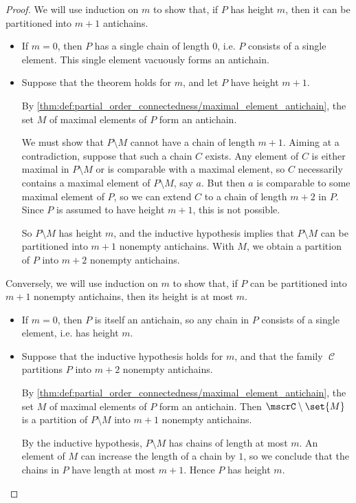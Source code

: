 \begin{proof}
  \SufficiencySubProof We will use induction on \( m \) to show that, if \( P \) has height \( m \), then it can be partitioned into \( m + 1 \) antichains.

  \begin{itemize}
    \item If \( m = 0 \), then \( P \) has a single chain of length \( 0 \), i.e. \( P \) consists of a single element. This single element vacuously forms an antichain.

    \item Suppose that the theorem holds for \( m \), and let \( P \) have height \( m + 1 \).

    By \cref{thm:def:partial_order_connectedness/maximal_element_antichain}, the set \( M \) of maximal elements of \( P \) form an antichain.

    We must show that \( P \setminus M \) cannot have a chain of length \( m + 1 \). Aiming at a contradiction, suppose that such a chain \( C \) exists. Any element of \( C \) is either maximal in \( P \setminus M \) or is comparable with a maximal element, so \( C \) necessarily contains a maximal element of \( P \setminus M \), say \( a \). But then \( a \) is comparable to some maximal element of \( P \), so we can extend \( C \) to a chain of length \( m + 2 \) in \( P \). Since \( P \) is assumed to have height \( m + 1 \), this is not possible.

    So \( P \setminus M \) has height \( m \), and the inductive hypothesis implies that \( P \setminus M \) can be partitioned into \( m + 1 \) nonempty antichains. With \( M \), we obtain a partition of \( P \) into \( m + 2 \) nonempty antichains.
  \end{itemize}

  \NecessitySubProof Conversely, we will use induction on \( m \) to show that, if \( P \) can be partitioned into \( m + 1 \) nonempty antichains, then its height is at most \( m \).

  \begin{itemize}
    \item If \( m = 0 \), then \( P \) is itself an antichain, so any chain in \( P \) consists of a single element, i.e. has height \( m \).

    \item Suppose that the inductive hypothesis holds for \( m \), and that the family \( \mscrC \) partitions \( P \) into \( m + 2 \) nonempty antichains.

    By \cref{thm:def:partial_order_connectedness/maximal_element_antichain}, the set \( M \) of maximal elements of \( P \) form an antichain. Then \( \mscrC \setminus \set{ M } \) is a partition of \( P \setminus M \) into \( m + 1 \) nonempty antichains.

    By the inductive hypothesis, \( P \setminus M \) has chains of length at most \( m \). An element of \( M \) can increase the length of a chain by \( 1 \), so we conclude that the chains in \( P \) have length at most \( m + 1 \). Hence \( P \) has height \( m \).
  \end{itemize}
\end{proof}

